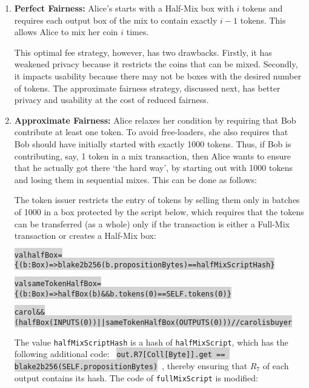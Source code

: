 \documentclass[11pt]{article}
\newcommand\Hi[2][lightgray]{%
	\hspace*{-\fboxsep}%
	\colorbox{#1}{#2}%
	\hspace*{-\fboxsep}%
}
\begin{document}
\begin{enumerate}
	\item 
\textbf{Perfect Fairness:} 
 Alice's starts with a Half-Mix box with $i$ tokens and requires each output box of the mix to contain exactly $i-1$ tokens. This allows Alice to mix her coin $i$ times. 
 
 This optimal fee strategy, however, has two drawbacks. Firstly, it has weakened privacy because it restricts the coins that can be mixed. Secondly, it impacts usability because there may not be boxes with the desired number of tokens. The approximate fairness strategy, discussed next, has better privacy and usability at the cost of reduced fairness.
 
 \item \textbf{Approximate Fairness:} Alice relaxes her condition by requiring that Bob contribute at least one token. %
 To avoid free-loaders, she also requires that Bob should have initially started with exactly 1000 tokens. Thus, if Bob is contributing, say, 1 token in a mix transaction, then Alice wants to ensure that he actually got there `the hard way', by starting out with 1000 tokens and losing them in sequential mixes. %
This can be done as follows:

The token issuer restricts the entry of tokens by selling them only in batches of 1000 in a box protected by the script below,
which requires that the tokens can be transferred (as a whole) only if the transaction is either a Full-Mix transaction or creates a Half-Mix box: 
\begin{alltt}
\Hi{val halfBox = \{(b:Box) => blake2b256(b.propositionBytes) == halfMixScriptHash\}}
\Hi{val sameTokenHalfBox = \{(b:Box) => halfBox(b) && b.tokens(0) == SELF.tokens(0)\}}
\Hi{carol && (halfBox(INPUTS(0)) || sameTokenHalfBox(OUTPUTS(0))) // carol is buyer}
\end{alltt}

The value \texttt{halfMixScriptHash} is a hash of \texttt{halfMixScript}, which has the following additional code: 
\texttt{\Hi{out.R7[Coll[Byte]].get == blake2b256(SELF.propositionBytes)}}, thereby ensuring that $R_7$ of each output contains its hash. The code of \texttt{fullMixScript} is modified:


\end{enumerate}
\end{document}
